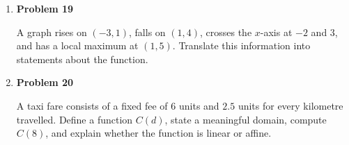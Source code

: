 \begin{enumerate}
\item \textbf{Problem 19}\par
A graph rises on \((-3,1)\), falls on \((1,4)\), crosses the \(x\)-axis at \(-2\) and \(3\), and has a local maximum at \((1,5)\). Translate this information into statements about the function.

\item \textbf{Problem 20}\par
A taxi fare consists of a fixed fee of \(6\) units and \(2.5\) units for every kilometre travelled. Define a function \(C(d)\), state a meaningful domain, compute \(C(8)\), and explain whether the function is linear or affine.
\end{enumerate}
